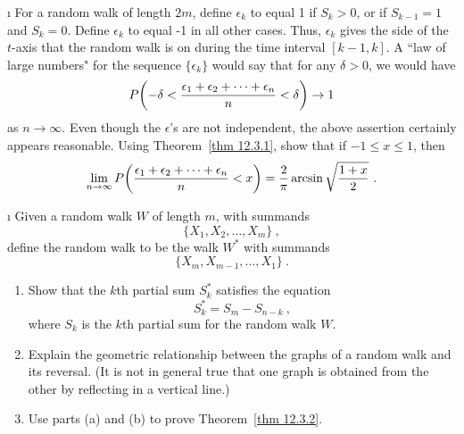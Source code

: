 \exercises
\begin{LJSItem}

\i\label{exer 12.3.1} For a random walk of length $2m$, define $\epsilon_k$ to equal 1 if
$S_k > 0$, or if $S_{k-1} = 1$ and $S_k = 0$.   Define $\epsilon_k$ to equal -1 in all other
cases.  Thus, $\epsilon_k$ gives the side of the $t$-axis that the random walk is on during the
time interval $[k-1, k]$.  A ``law of large numbers" for the sequence $\{\epsilon_k\}$ would say
that for any $\delta > 0$, we would have
$$P\biggl(-\delta < {{\epsilon_1 + \epsilon_2 + \cdots + \epsilon_n}\over{n}} < \delta \biggr)
\rightarrow 1$$
as $n \rightarrow \infty$.  Even though the $\epsilon$'s are not independent, the above assertion
certainly appears reasonable.  Using Theorem~\ref{thm 12.3.1}, show that if $-1 \le x \le 1$, then
$$\lim_{n \rightarrow \infty} P\biggl({{\epsilon_1 + \epsilon_2 + \cdots + \epsilon_n}\over{n}}
< x\biggr) = {2\over{\pi}} \arcsin\sqrt{{{1 + x}\over{2}}}\ .$$
 
\i\label{exer 12.3.2} Given a random walk $W$ of length $m$, with summands 
\[ \{X_1, X_2, \ldots,X_m\}\ , \]  
\noindent define the  random walk to be the walk $W^*$ with
summands 
\[ \{X_m, X_{m-1}, \ldots, X_1\}\ . \]  
\begin{enumerate}
\item  Show that the $k$th partial sum $S^*_k$ satisfies the equation
$$S^*_k = S_m - S_{n-k}\ ,$$
where $S_k$ is the $k$th partial sum for the random walk $W$.
\item Explain the geometric relationship between the graphs of a random walk and its
reversal.  (It is not in general true that one graph is obtained from the other by reflecting in a
vertical line.)
\item Use parts (a) and (b) to prove Theorem~\ref{thm 12.3.2}.
\end{enumerate}

\end{LJSItem}

 
